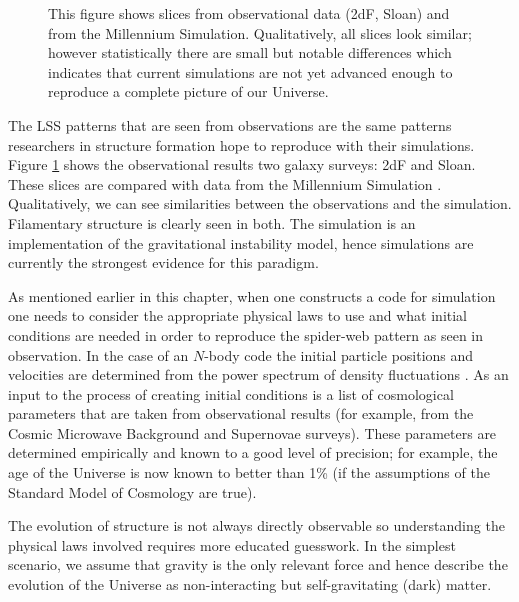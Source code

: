 \begin{figure}[htb]
   \begin{center}
     \leavevmode
                \epsfxsize=80mm


   \end{center}
\caption{This figure shows slices from observational data (2dF, Sloan) and from the Millennium Simulation. Qualitatively, all slices look similar; however statistically there are small but notable differences which indicates that current simulations are not yet advanced enough to reproduce a complete picture of our Universe. \citep{bib_2df}}
\label{fig.2df}
\end{figure}

The LSS patterns that are seen from observations are the same patterns researchers in structure formation hope to reproduce with their simulations. Figure \ref{fig.2df} shows the observational results two galaxy surveys: 2dF and Sloan. These slices are compared with data from the Millennium Simulation \citep{bib_mil}. Qualitatively, we can see similarities between the observations and the simulation. Filamentary structure is clearly seen in both. The simulation is an implementation of the gravitational instability model, hence simulations are currently the strongest evidence for this paradigm.

As mentioned earlier in this chapter, when one constructs a code for simulation one needs to consider the appropriate physical laws to use and what initial conditions are needed in order to reproduce the spider-web pattern as seen in observation. In the case of an $N$-body code the initial particle positions and velocities are determined from the power spectrum of density fluctuations \citep{bib_yep}. As an input to the process of creating initial conditions is a list of cosmological parameters that are taken from observational results (for example, from the Cosmic Microwave Background and Supernovae surveys). These parameters are determined empirically and known to a good level of precision; for example, the age of the Universe is now known to better than 1\% \citep{bib_wmap} (if the assumptions of the Standard Model of Cosmology are true).

The evolution of structure is not always directly observable so understanding the physical laws involved requires more educated guesswork. In the simplest scenario, we assume that gravity is the only relevant force and hence describe the evolution of the Universe as non-interacting but self-gravitating (dark) matter.

